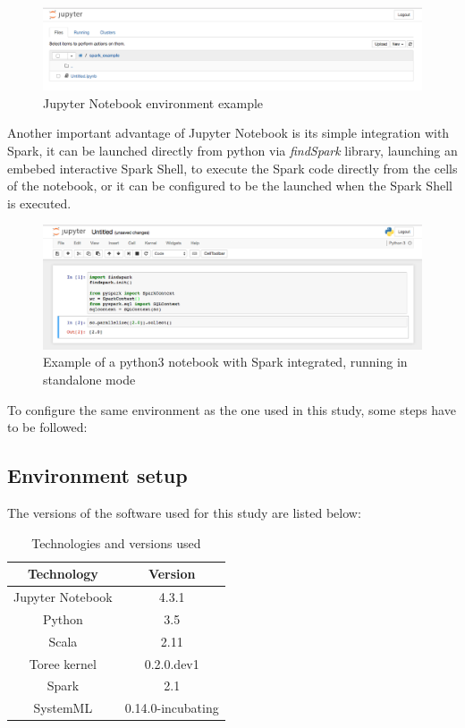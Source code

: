 \documentclass[11pt]{book} %
\begin{document}
    \begin{figure}[!ht]
      \centering
      \includegraphics[width=\textwidth]{jupyter_notebook.png}
      \caption{Jupyter Notebook environment example}
      \label{jupyter_notebook_environment}
    \end{figure}

    Another important advantage of Jupyter Notebook is its simple integration with Spark, it can be launched directly from python via \emph{findSpark} library, launching an embebed interactive Spark Shell, to execute the Spark code directly from the cells of the notebook, or it can be configured to be the launched when the Spark Shell is executed.

    \begin{figure}[!ht]
      \centering
      \includegraphics[width=\textwidth]{Spark_notebook_example.png}
      \caption{Example of a python3 notebook with Spark integrated, running in standalone mode}
      \label{notebook_Spark_example}
    \end{figure}

    To configure the same environment as the one used in this study, some steps have to be followed:

    \subsection{Environment setup}

      The versions of the software used for this study are listed below:

    \begin{table}[!ht]
      \centering
      \begin{tabular}{| c | c |}
        \hline

        Technology & Version \\ \hline
        Jupyter Notebook & 4.3.1 \\ \hline
        Python & 3.5 \\ \hline
        Scala & 2.11 \\ \hline
        Toree kernel & 0.2.0.dev1 \\ \hline
        Spark & 2.1 \\ \hline
        SystemML & 0.14.0-incubating \\

        \hline
      \end{tabular}
      \caption{Technologies and versions used}
    \end{table}
\end{document}
